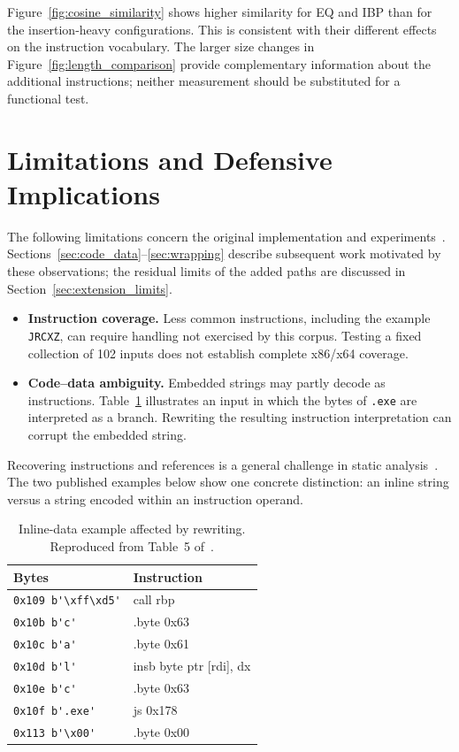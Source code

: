 \documentclass[runningheads]{llncs}
\begin{document}
Figure~\ref{fig:cosine_similarity} shows higher similarity for EQ and IBP than for the insertion-heavy configurations. This is consistent with their different effects on the instruction vocabulary. The larger size changes in Figure~\ref{fig:length_comparison} provide complementary information about the additional instructions; neither measurement should be substituted for a functional test.

\section{Limitations and Defensive Implications}\label{sec:limitations}
The following limitations concern the original implementation and experiments~\cite{zone_secrypt_2026}. Sections~\ref{sec:code_data}--\ref{sec:wrapping} describe subsequent work motivated by these observations; the residual limits of the added paths are discussed in Section~\ref{sec:extension_limits}.
\begin{itemize}
    \item \textbf{Instruction coverage.} Less common instructions, including the example \texttt{JRCXZ}, can require handling not exercised by this corpus. Testing a fixed collection of 102 inputs does not establish complete x86/x64 coverage.
    \item \textbf{Code--data ambiguity.} Embedded strings may partly decode as instructions. Table~\ref{tab:broken-payload} illustrates an input in which the bytes of \texttt{.exe} are interpreted as a branch. Rewriting the resulting instruction interpretation can corrupt the embedded string.
\end{itemize}

Recovering instructions and references is a general challenge in static
analysis~\cite{staticdisasmTuringComplete}. The two published examples
below show one concrete distinction: an inline string versus a string
encoded within an instruction operand.

\begin{table}[t]
    \caption{Inline-data example affected by rewriting. Reproduced from Table~5 of~\cite{zone_secrypt_2026}.}
    \label{tab:broken-payload}
    \small
    \centering
    \setlength{\tabcolsep}{3pt}
    \begin{tabular}{ll}
        \hline
        \textbf{Bytes}  & \textbf{Instruction} \\ \hline
        \verb|0x109 b'\xff\xd5'|  & call  rbp \\ \hline
        \verb|0x10b b'c'|         & .byte 0x63 \\ \hline
        \verb|0x10c b'a'|         & .byte 0x61 \\ \hline
        \verb|0x10d b'l'|         & insb  byte ptr [rdi], dx \\ \hline
        \verb|0x10e b'c'|         & .byte 0x63 \\ \hline
        \verb|0x10f b'.exe'|      & js    0x178 \\ \hline
        \verb|0x113 b'\x00'|      & .byte 0x00 \\ \hline
    \end{tabular}
\end{table}
\end{document}
